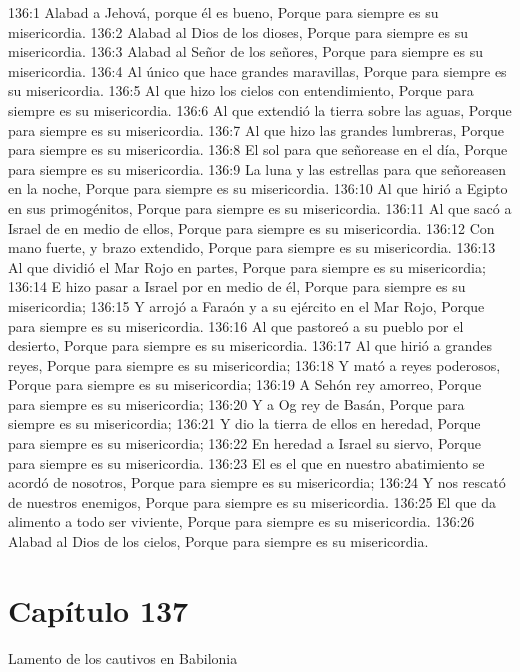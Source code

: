 136:1 Alabad a Jehová, porque él es bueno, 
Porque para siempre es su misericordia. 
136:2 Alabad al Dios de los dioses, 
Porque para siempre es su misericordia. 
136:3 Alabad al Señor de los señores, 
Porque para siempre es su misericordia. 
136:4 Al único que hace grandes maravillas, 
Porque para siempre es su misericordia. 
136:5 Al que hizo los cielos con entendimiento, 
Porque para siempre es su misericordia. 
136:6 Al que extendió la tierra sobre las aguas, 
Porque para siempre es su misericordia. 
136:7 Al que hizo las grandes lumbreras, 
Porque para siempre es su misericordia. 
136:8 El sol para que señorease en el día, 
Porque para siempre es su misericordia. 
136:9 La luna y las estrellas para que señoreasen en la noche, 
Porque para siempre es su misericordia. 
136:10 Al que hirió a Egipto en sus primogénitos, 
Porque para siempre es su misericordia. 
136:11 Al que sacó a Israel de en medio de ellos, 
Porque para siempre es su misericordia. 
136:12 Con mano fuerte, y brazo extendido, 
Porque para siempre es su misericordia. 
136:13 Al que dividió el Mar Rojo en partes, 
Porque para siempre es su misericordia; 
136:14 E hizo pasar a Israel por en medio de él, 
Porque para siempre es su misericordia; 
136:15 Y arrojó a Faraón y a su ejército en el Mar Rojo, 
Porque para siempre es su misericordia. 
136:16 Al que pastoreó a su pueblo por el desierto, 
Porque para siempre es su misericordia. 
136:17 Al que hirió a grandes reyes, 
Porque para siempre es su misericordia; 
136:18 Y mató a reyes poderosos, 
Porque para siempre es su misericordia; 
136:19 A Sehón rey amorreo, 
Porque para siempre es su misericordia; 
136:20 Y a Og rey de Basán, 
Porque para siempre es su misericordia; 
136:21 Y dio la tierra de ellos en heredad, 
Porque para siempre es su misericordia; 
136:22 En heredad a Israel su siervo, 
Porque para siempre es su misericordia. 
136:23 El es el que en nuestro abatimiento se acordó de nosotros, 
Porque para siempre es su misericordia; 
136:24 Y nos rescató de nuestros enemigos, 
Porque para siempre es su misericordia. 
136:25 El que da alimento a todo ser viviente, 
Porque para siempre es su misericordia. 
136:26 Alabad al Dios de los cielos, 
Porque para siempre es su misericordia. 
\section*{Capítulo 137}
Lamento de los cautivos en Babilonia 
 
